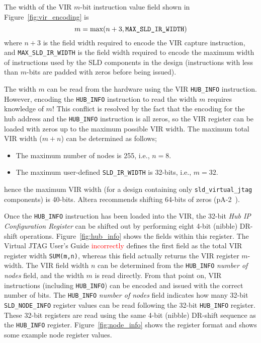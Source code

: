 \documentclass[10pt,twoside]{article}
\begin{document}
The width of the VIR $m$-bit instruction value field shown
in Figure~\ref{fig:vir_encoding} is
%
\begin{equation}
m = \mbox{max}(n+3, \mbox{\tt MAX\_SLD\_IR\_WIDTH})
\label{eq:vir_width_m}
\end{equation}
%
where $n+3$ is the field width required to encode the
VIR capture instruction, and \verb+MAX_SLD_IR_WIDTH+ is the
field width required to encode the maximum width of 
instructions used by the SLD components in the design
(instructions with less than $m$-bits are padded with
zeros before being issued).

The width $m$ can be read from the hardware using
the VIR \verb+HUB_INFO+ instruction. However, encoding the 
 \verb+HUB_INFO+ instruction to read the width $m$ requires
knowledge of $m$! This conflict 
is resolved by the fact that the encoding for the hub address
and the \verb+HUB_INFO+ instruction is all zeros, so the VIR
register can be loaded with zeros up to the maximum possible 
VIR width. The maximum total VIR width ($m+n$) can be determined as
follows;
%
\begin{itemize}
\item The maximum number of nodes is 255, i.e., $n = 8$.
\item The maximum user-defined \verb+SLD_IR_WIDTH+ is
32-bits, i.e., $m = 32$.
\end{itemize}
%
hence the maximum VIR width (for a design containing only
\verb+sld_virtual_jtag+ components) is 40-bits. Altera
recommends shifting 64-bits of zeros 
(pA-2~\cite{Altera_Virtual_JTAG_2008}).

Once the \verb+HUB_INFO+ instruction has been loaded into
the VIR, the 32-bit {\em Hub IP Configuration Register}
can be shifted out by performing eight 4-bit (nibble) DR-shift
operations. Figure~\ref{fig:hub_info} shows the fields within
this register. The Virtual JTAG User's Guide
\textcolor{red}{incorrectly} defines the first field as the
total VIR register width \verb+SUM(m,n)+, whereas this field
actually returns the VIR register $m$-width. The VIR field
width $n$ can be determined from the \verb+HUB_INFO+
{\em number of nodes} field, and the width $m$ is read
directly. From that point on, VIR instructions (including 
\verb+HUB_INFO+) can be encoded and issued with the correct 
number of bits. The \verb+HUB_INFO+ {\em number of nodes}
field indicates how many 32-bit \verb+SLD_NODE_INFO+ register
values can be read following the 32-bit \verb+HUB_INFO+
register. These 32-bit registers are read using the same
4-bit (nibble) DR-shift sequence as the \verb+HUB_INFO+
register. Figure~\ref{fig:node_info}
shows the register format and shows some example node
register values.
\end{document}
